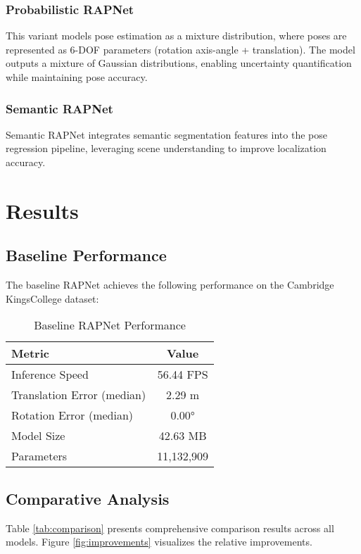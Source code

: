 \documentclass[conference]{IEEEtran}
\begin{document}
\subsubsection{Probabilistic RAPNet}
This variant models pose estimation as a mixture distribution, where poses are represented as 6-DOF parameters (rotation axis-angle + translation). The model outputs a mixture of Gaussian distributions, enabling uncertainty quantification while maintaining pose accuracy.

\subsubsection{Semantic RAPNet}
Semantic RAPNet integrates semantic segmentation features into the pose regression pipeline, leveraging scene understanding to improve localization accuracy.

\section{Results}

\subsection{Baseline Performance}

The baseline RAPNet achieves the following performance on the Cambridge KingsCollege dataset:

\begin{table}[h]
\centering
\caption{Baseline RAPNet Performance}
\label{tab:baseline}
\begin{tabular}{lc}
\toprule
\textbf{Metric} & \textbf{Value} \\
\midrule
Inference Speed & 56.44 FPS \\
Translation Error (median) & 2.29 m \\
Rotation Error (median) & 0.00° \\
Model Size & 42.63 MB \\
Parameters & 11,132,909 \\
\bottomrule
\end{tabular}
\end{table}

\subsection{Comparative Analysis}

Table \ref{tab:comparison} presents comprehensive comparison results across all models. Figure \ref{fig:improvements} visualizes the relative improvements.
\end{document}
